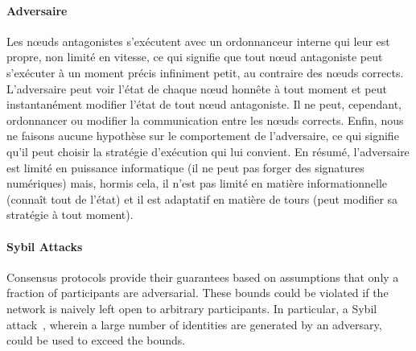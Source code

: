 \documentclass[letterpaper,twocolumn,10pt]{article}
\theoremstyle{definition}
\begin{document}
\paragraph{Adversaire}
Les nœuds antagonistes s'exécutent avec un ordonnanceur interne qui leur est propre, non limité en vitesse, ce qui signifie que tout nœud antagoniste peut s'exécuter à un moment précis infiniment petit, au contraire des nœuds corrects.
L'adversaire peut voir l'état de chaque nœud honnête à tout moment et peut instantanément modifier l'état de tout nœud antagoniste.
Il ne peut, cependant, ordonnancer ou modifier la communication entre les nœuds corrects.
Enfin, nous ne faisons aucune hypothèse sur le comportement de l'adversaire, ce qui signifie qu'il peut choisir la stratégie d'exécution qui lui convient.
En résumé, l'adversaire est limité en puissance informatique (il ne peut pas forger des signatures numériques) mais, hormis cela, il n'est pas limité en matière informationnelle (connaît tout de l'état) et il est adaptatif en matière de tours (peut modifier sa stratégie à tout moment).

\paragraph{Sybil Attacks}
Consensus protocols provide their guarantees based on assumptions that only a fraction of participants are adversarial.
These bounds could be violated if the network is naively left open to arbitrary participants.
In particular, a Sybil attack~\cite{douceur2002sybil}, wherein a large number of identities are generated by an adversary, could be used to exceed the bounds.
\end{document}
